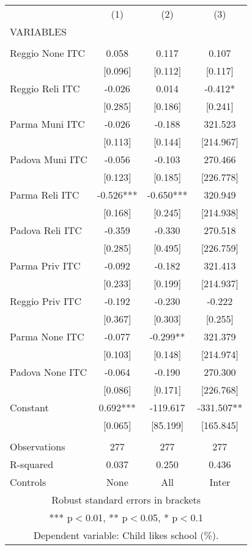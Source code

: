\begin{tabular}{lccc} \hline
 & (1) & (2) & (3) \\
VARIABLES &  &  &  \\ \hline
 &  &  &  \\
Reggio None ITC & 0.058 & 0.117 & 0.107 \\
 & [0.096] & [0.112] & [0.117] \\
Reggio Reli ITC & -0.026 & 0.014 & -0.412* \\
 & [0.285] & [0.186] & [0.241] \\
Parma Muni ITC & -0.026 & -0.188 & 321.523 \\
 & [0.113] & [0.144] & [214.967] \\
Padova Muni ITC & -0.056 & -0.103 & 270.466 \\
 & [0.123] & [0.185] & [226.778] \\
Parma Reli ITC & -0.526*** & -0.650*** & 320.949 \\
 & [0.168] & [0.245] & [214.938] \\
Padova Reli ITC & -0.359 & -0.330 & 270.518 \\
 & [0.285] & [0.495] & [226.759] \\
Parma Priv ITC & -0.092 & -0.182 & 321.413 \\
 & [0.233] & [0.199] & [214.937] \\
Reggio Priv ITC & -0.192 & -0.230 & -0.222 \\
 & [0.367] & [0.303] & [0.255] \\
Parma None ITC & -0.077 & -0.299** & 321.379 \\
 & [0.103] & [0.148] & [214.974] \\
Padova None ITC & -0.064 & -0.190 & 270.300 \\
 & [0.086] & [0.171] & [226.768] \\
Constant & 0.692*** & -119.617 & -331.507** \\
 & [0.065] & [85.199] & [165.845] \\
 &  &  &  \\
Observations & 277 & 277 & 277 \\
R-squared & 0.037 & 0.250 & 0.436 \\
 Controls & None & All & Inter \\ \hline
\multicolumn{4}{c}{ Robust standard errors in brackets} \\
\multicolumn{4}{c}{ *** p$<$0.01, ** p$<$0.05, * p$<$0.1} \\
\multicolumn{4}{c}{ Dependent variable: Child likes school (\%).} \\
\end{tabular}
